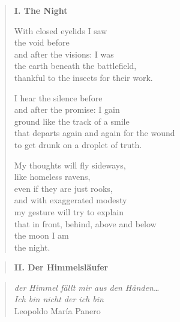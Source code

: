 \begin{verse}

{\bfseries I. The Night}

With closed eyelids I saw\\
the void before\\
and after the visions: I was\\
the earth beneath the battlefield,\\
thankful to the insects for their work.

I hear the silence before\\
and after the promise: I gain\\
ground like the track of a smile\\
that departs again and again for the wound\\
to get drunk on a droplet of truth.

My thoughts will fly sideways,\\
like homeless ravens,\\
even if they are just rooks,\\
and with exaggerated modesty\\
my gesture will try to explain\\
that in front, behind, above and below\\
the moon I am\\
the night.
\end{verse}

\clearpage

\begin{verse}
{\bfseries II. Der Himmelsläufer}
\end{verse}

\begin{quote}
{\itshape der Himmel fällt mir aus den Händen\ldots\\
Ich bin nicht der ich bin}\\
\hspace*{2em} Leopoldo María Panero
\end{quote}

